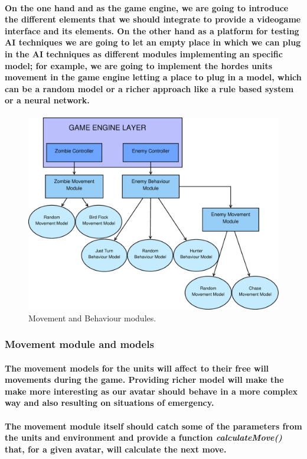 \documentclass[a4paper,10pt]{article}
\newcommand{\p}[1]{\paragraph{\indent\textnormal{#1}}}
\begin{document}
  \p{On the one hand and as the game engine, we are going to introduce the different elements that we should integrate to provide a videogame interface and its elements. On the other hand as a platform for testing AI techniques we are going to let an empty place in which we can plug in the AI techniques as different modules implementing an specific model; for example, we are going to implement the hordes units movement in the game engine letting a place to plug in a model, which can be a random model or a richer approach like a rule based system or a neural network.}
  
	\begin{figure}[hbt]
	    \begin{center}
		\includegraphics[scale=.2]{modulos.eps}

	    \end{center}
	    \caption{Movement and Behaviour modules.}
	\end{figure}

    \subsubsection{Movement module and models}
      
      \p{The movement models for the units will affect to their free will movements during the game. Providing richer model will make the make more interesting as our avatar should behave in a more complex way and also resulting on situations of emergency.}

      \p{The movement module itself should catch some of the parameters from the units and environment and provide a function \textit{calculateMove()} that, for a given avatar, will calculate the next move.}
\end{document}
